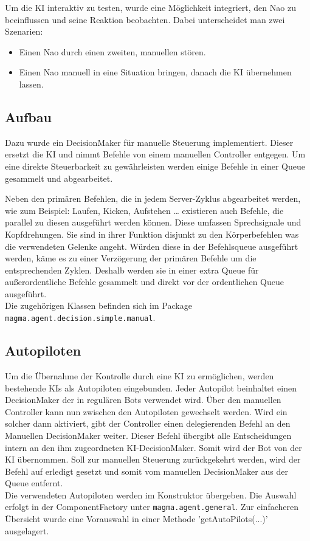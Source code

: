 Um die KI interaktiv zu testen, wurde eine Möglichkeit integriert, den Nao zu beeinflussen und seine Reaktion beobachten. Dabei unterscheidet man zwei Szenarien:
\begin{itemize}
\item Einen Nao durch einen zweiten, manuellen stören.
\item Einen Nao manuell in eine Situation bringen, danach die KI übernehmen lassen.
\end{itemize}

\subsection{Aufbau}
Dazu wurde ein DecisionMaker für manuelle Steuerung implementiert. Dieser ersetzt die KI und nimmt Befehle von einem manuellen Controller entgegen.
Um eine direkte Steuerbarkeit zu gewährleisten werden einige Befehle in einer Queue gesammelt und abgearbeitet.

Neben den primären Befehlen, die in jedem Server-Zyklus abgearbeitet werden, wie zum Beispiel: Laufen, Kicken, Aufstehen … existieren auch Befehle, die parallel zu diesen ausgeführt werden können. Diese umfassen Sprechsignale und Kopfdrehungen. Sie sind in ihrer Funktion disjunkt zu den Körperbefehlen was die verwendeten Gelenke angeht. Würden diese in der Befehlsqueue ausgeführt werden, käme es zu einer Verzögerung der primären Befehle um die entsprechenden Zyklen. Deshalb werden sie in einer extra Queue für außerordentliche Befehle gesammelt und direkt vor der ordentlichen Queue ausgeführt.\\
Die zugehörigen Klassen befinden sich im Package \texttt{magma.agent.decision.simple.manual}.

\subsection{Autopiloten}
Um die Übernahme der Kontrolle durch eine KI zu ermöglichen, werden bestehende KIs als Autopiloten eingebunden. Jeder Autopilot beinhaltet einen DecisionMaker der in regulären Bots verwendet wird. Über den manuellen Controller kann nun zwischen den Autopiloten gewechselt werden. Wird ein solcher dann aktiviert, gibt der Controller einen delegierenden Befehl an den Manuellen DecisionMaker weiter. Dieser Befehl übergibt alle Entscheidungen intern an den ihm zugeordneten KI-DecisionMaker. Somit wird der Bot von der KI übernommen. Soll zur manuellen Steuerung zurückgekehrt werden, wird der Befehl auf erledigt gesetzt und somit vom manuellen DecisionMaker aus der Queue entfernt.\\
Die verwendeten Autopiloten werden im Konstruktor übergeben. Die Auswahl erfolgt in der ComponentFactory unter \texttt{magma.agent.general}. Zur einfacheren Übersicht wurde eine Vorauswahl in einer Methode 'getAutoPilots(...)' ausgelagert.

